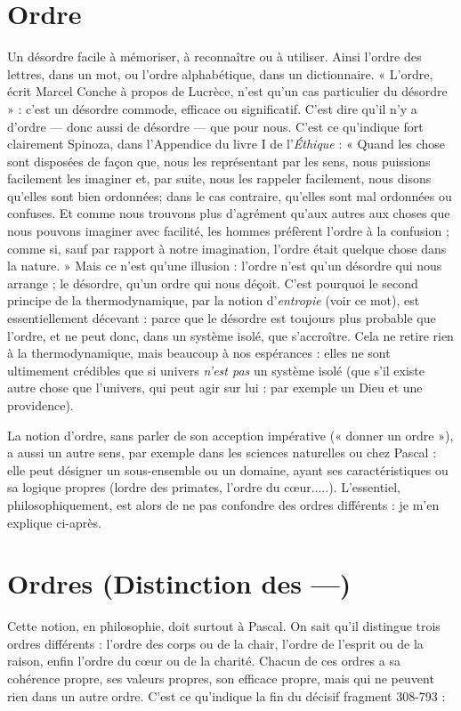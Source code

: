 \section{Ordre}
Un désordre facile à mémoriser, à reconnaître ou à utiliser. Ainsi
l’ordre des lettres, dans un mot, ou l’ordre alphabétique, dans un
dictionnaire. « L'ordre, écrit Marcel Conche à propos de Lucrèce, n’est qu’un
cas particulier du désordre » : c’est un désordre commode, efficace ou significatif.
C’est dire qu’il n’y a d’ordre — donc aussi de désordre — que pour nous.
C’est ce qu’indique fort clairement Spinoza, dans l’Appendice du livre I de
l'{\it Éthique} : « Quand les chose sont disposées de façon que, nous les représentant
par les sens, nous puissions facilement les imaginer et, par suite, nous les rappeler
facilement, nous disons qu’elles sont bien ordonnées; dans le cas
contraire, qu’elles sont mal ordonnées ou confuses. Et comme nous trouvons
plus d’agrément qu’aux autres aux choses que nous pouvons imaginer avec facilité,
les hommes préfèrent l’ordre à la confusion ; comme si, sauf par rapport à
notre imagination, l’ordre était quelque chose dans la nature. » Mais ce n’est
qu'une illusion : l’ordre n’est qu’un désordre qui nous arrange ; le désordre,
qu'un ordre qui nous déçoit. C’est pourquoi le second principe de la thermodynamique,
par la notion d’{\it entropie} (voir ce mot), est essentiellement
décevant : parce que le désordre est toujours plus probable que l’ordre, et ne
peut donc, dans un système isolé, que s’accroître. Cela ne retire rien à la thermodynamique,
mais beaucoup à nos espérances : elles ne sont ultimement crédibles
que si univers {\it n'est pas} un système isolé (que s’il existe autre chose que
l'univers, qui peut agir sur lui : par exemple un Dieu et une providence).

La notion d’ordre, sans parler de son acception impérative (« donner un
ordre »), a aussi un autre sens, par exemple dans les sciences naturelles ou chez
Pascal : elle peut désigner un sous-ensemble ou un domaine, ayant ses caractéristiques
ou sa logique propres (lordre des primates, l’ordre du cœur.....).
L'essentiel, philosophiquement, est alors de ne pas confondre des ordres
différents : je m’en explique ci-après.

\section{Ordres (Distinction des —)}
Cette notion, en philosophie, doit surtout
à Pascal. On sait qu’il distingue
trois ordres différents : l’ordre des corps ou de la chair, l’ordre de l’esprit ou de
la raison, enfin l’ordre du cœur ou de la charité. Chacun de ces ordres a sa
cohérence propre, ses valeurs propres, son efficace propre, mais qui ne peuvent
rien dans un autre ordre. C’est ce qu’indique la fin du décisif fragment 308-793 :

